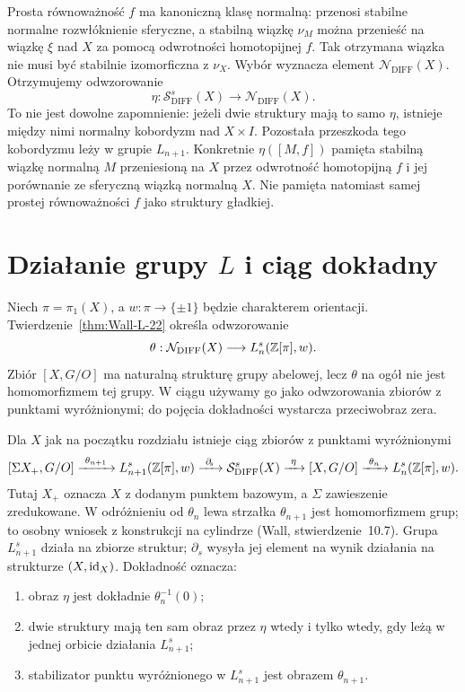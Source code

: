 Prosta równoważność $f$ ma kanoniczną klasę
normalną: przenosi stabilne normalne
rozwłóknienie sferyczne, a stabilną wiązkę
$\nu_M$ można przenieść na wiązkę $\xi$
nad $X$ za pomocą odwrotności homotopijnej $f$.
Tak otrzymana wiązka nie musi być
stabilnie izomorficzna z $\nu_X$.
Wybór wyznacza element $\mathcal N_{\mathrm{DIFF}}(X)$.
Otrzymujemy odwzorowanie
\[
 \eta:\mathcal S^s_{\mathrm{DIFF}}(X)
          \longrightarrow\mathcal N_{\mathrm{DIFF}}(X).
\]
To nie jest dowolne zapomnienie:
jeżeli dwie struktury mają to samo $\eta$,
istnieje między nimi normalny kobordyzm
nad $X\times I$. Pozostała przeszkoda
tego kobordyzmu leży w grupie $L_{n+1}$.
Konkretnie $\eta([M,f])$ pamięta stabilną
wiązkę normalną $M$ przeniesioną na $X$
przez odwrotność homotopijną $f$ i jej
porównanie ze sferyczną wiązką normalną $X$.
Nie pamięta natomiast samej prostej
równoważności $f$ jako struktury gładkiej.

\section{Działanie grupy \texorpdfstring{$L$}{L} i ciąg dokładny}
\label{sec:exact-surgery-23}

Niech $\pi=\pi_1(X)$, a
$w:\pi\to\{\pm1\}$ będzie charakterem
orientacji. Twierdzenie~\ref{thm:Wall-L-22}
określa odwzorowanie
\[
 \theta:\mathcal N_{\mathrm{DIFF}}(X)
       \longrightarrow L_n^s(\mathbb{Z}[\pi],w).
\]
Zbiór $[X,G/O]$ ma naturalną strukturę grupy
abelowej, lecz $\theta$ na ogół nie jest
homomorfizmem tej grupy. W ciągu używamy go
jako odwzorowania zbiorów z punktami wyróżnionymi;
do pojęcia dokładności wystarcza przeciwobraz zera.

\begin{twierdzenie}
\label{thm:exact-surgery-23}
Dla $X$ jak na początku rozdziału istnieje
ciąg zbiorów z punktami wyróżnionymi
\begin{equation}\label{eq:exact-surgery-23}
 [\Sigma X_+,G/O]\xrightarrow{\ \theta_{n+1}\ }
 L_{n+1}^s(\mathbb{Z}[\pi],w)
 \xrightarrow{\ \partial_{\!s}\ }
 \mathcal S^s_{\mathrm{DIFF}}(X)
 \xrightarrow{\ \eta\ }
 [X,G/O]
 \xrightarrow{\ \theta_n\ }
 L_n^s(\mathbb{Z}[\pi],w).
\end{equation}
Tutaj $X_+$ oznacza $X$ z dodanym punktem
bazowym, a $\Sigma$ zawieszenie zredukowane.
W odróżnieniu od $\theta_n$ lewa strzałka
$\theta_{n+1}$ jest homomorfizmem grup;
to osobny wniosek z konstrukcji na cylindrze
(Wall, stwierdzenie~10.7).
Grupa $L_{n+1}^s$ działa na zbiorze struktur;
$\partial_{\!s}$ wysyła jej element na wynik
działania na strukturze $(X,\mathrm{id}_X)$.
Dokładność oznacza:
\begin{enumerate}[label=(\roman*)]
\item obraz $\eta$ jest dokładnie
      $\theta_n^{-1}(0)$;
\item dwie struktury mają ten sam obraz
      przez $\eta$ wtedy i tylko wtedy,
      gdy leżą w jednej orbicie działania
      $L_{n+1}^s$;
\item stabilizator punktu wyróżnionego
      w $L_{n+1}^s$ jest obrazem
      $\theta_{n+1}$.
\end{enumerate}
\end{twierdzenie}


